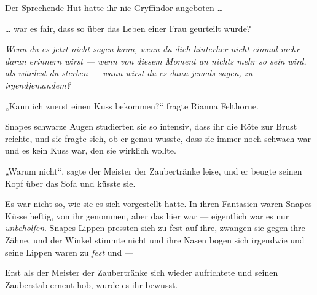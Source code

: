 Der Sprechende Hut hatte ihr nie Gryffindor angeboten …

… war es fair, dass so über das Leben einer Frau geurteilt wurde?

\emph{Wenn du es jetzt nicht sagen kann, wenn du dich hinterher nicht einmal mehr daran erinnern wirst — wenn von diesem Moment an nichts mehr so sein wird, als würdest du sterben — wann wirst du es dann jemals sagen, zu irgendjemandem?}

„Kann ich zuerst einen Kuss bekommen?“ fragte Rianna Felthorne.

Snapes schwarze Augen studierten sie so intensiv, dass ihr die Röte zur Brust reichte, und sie fragte sich, ob er genau wusste, dass sie immer noch schwach war und es kein Kuss war, den sie wirklich wollte.

„Warum nicht“, sagte der Meister der Zaubertränke leise, und er beugte seinen Kopf über das Sofa und küsste sie.

Es war nicht so, wie sie es sich vorgestellt hatte. In ihren Fantasien waren Snapes Küsse heftig, von ihr genommen, aber das hier war — eigentlich war es nur \emph{unbeholfen}. Snapes Lippen pressten sich zu fest auf ihre, zwangen sie gegen ihre Zähne, und der Winkel stimmte nicht und ihre Nasen bogen sich irgendwie und seine Lippen waren zu \emph{fest} und —

Erst als der Meister der Zaubertränke sich wieder aufrichtete und seinen Zauberstab erneut hob, wurde es ihr bewusst.

